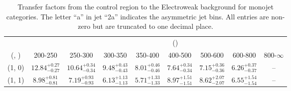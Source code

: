 \begin{table}[h!]
\tiny
\centering
\caption{Transfer factors from the \mmj control region to the Electroweak background for monojet categories. The letter ``a'' in jet \eg ``2a''  indicates the asymmetric jet bins. All entries are non-zero but are truncated to one decimal place.\label{tab:tf_mumu_total_mono}}
\begin{tabular}
{ccccccccc}
	\hline\hline
&	& \multicolumn{8}{c}{\scalht (\gev)} \\ 
	 (\njet,  \nb) & 200-250 & 250-300 & 300-350 & 350-400 & 400-500 & 500-600 & 600-800 & 800-$\infty$ \\ [0.8ex] 
\hline
	(1, 0) & $12.84^{+ 0.27 }_{- 0.27 }$ & $10.64^{+ 0.34 }_{- 0.34 }$ & $9.48^{+ 0.43 }_{- 0.43 }$ & $8.01^{+ 0.46 }_{- 0.46 }$ & $7.64^{+ 0.34 }_{- 0.34 }$ & $7.15^{+ 0.36 }_{- 0.36 }$ & $6.26^{+ 0.37 }_{- 0.37 }$ & -- \\[0.5ex] 
	(1, 1) & $8.98^{+ 0.81 }_{- 0.81 }$ & $7.19^{+ 0.93 }_{- 0.93 }$ & $6.13^{+ 1.13 }_{- 1.13 }$ & $5.71^{+ 1.33 }_{- 1.33 }$ & $8.97^{+ 1.51 }_{- 1.51 }$ & $8.62^{+ 2.07 }_{- 2.07 }$ & $6.55^{+ 1.54 }_{- 1.54 }$ & -- \\[0.5ex] 
	\hline
	\hline
\end{tabular}
\end{table}
